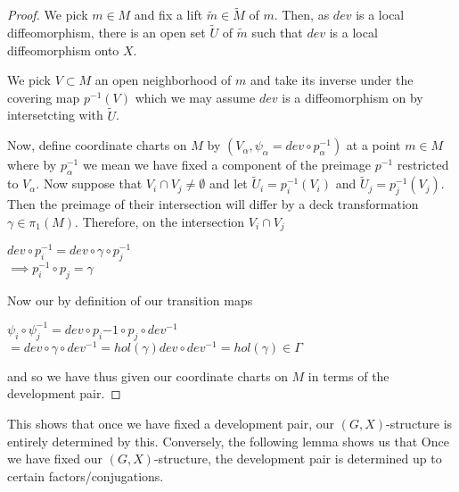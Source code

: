\begin{proof}
    We pick $m\in M$ and fix a lift $\tilde{m}\in \tilde{M}$ of $m$. Then, as
    $dev$ is a local diffeomorphism, there is an open set $\tilde{U}$ of $\tilde{m}$
    such that $dev$ is a local diffeomorphism onto $X$.

    We pick $V \subset M$ an open neighborhood of $m$ and take its inverse under
    the covering map $p^{-1}(V)$ which we may assume $dev$ is a diffeomorphism on
    by intersetcting with $\tilde{U}$.

    Now, define coordinate charts on $M$ by $(V_{\alpha}, \psi_{\alpha} = dev \circ
        p^{-1}_{\alpha})$ at a point $m \in M$ where by $p^{-1}_{\alpha}$ we mean we
    have fixed a component of the preimage $p^{-1}$ restricted to $V_{\alpha}$. Now
    suppose that $V_i \cap V_j \neq \emptyset$ and let $\tilde{U}_i =
        p_i^{-1}(V_i)$ and $\tilde{U}_j = p_j^{-1}(V_j)$. Then the preimage of their
    intersection will differ by a deck transformation $\gamma \in \pi_1(M)$.
    Therefore, on the intersection $V_i \cap V_j$
    \begin{center}
        $dev \circ p_i^{-1} = dev \circ \gamma \circ p_j^{-1}$\\
        $\implies p^{-1}_i \circ p_j = \gamma$
    \end{center}

    Now our by definition of our transition maps
    \begin{center}
        $\psi_i \circ \psi_j^{-1} = dev \circ p_i{-1} \circ p_j \circ dev^{-1}$\\
        $= dev \circ \gamma \circ dev^{-1} = hol(\gamma)dev\circ dev^{-1} = hol(\gamma) \in \Gamma$
    \end{center}

    and so we have thus given our coordinate charts on $M$ in terms of the
    development pair.
\end{proof}

This shows that once we have fixed a development pair, our $(G,X)$-structure is
entirely determined by this. Conversely, the following lemma shows us that Once
we have fixed our $(G,X)$-structure, the development pair is determined up to
certain factors/conjugations.

